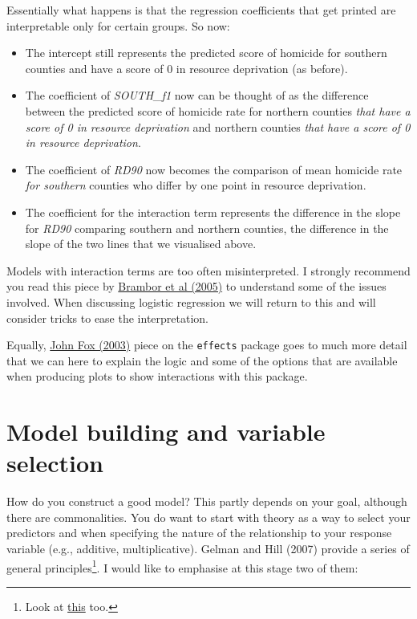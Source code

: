 \documentclass[]{book}
\begin{document}
Essentially what happens is that the regression coefficients that get printed are interpretable only for certain groups. So now:

\begin{itemize}
\item
  The intercept still represents the predicted score of homicide for southern counties and have a score of 0 in resource deprivation (as before).
\item
  The coefficient of \emph{SOUTH\_f1} now can be thought of as the difference between the predicted score of homicide rate for northern counties \emph{that have a score of 0 in resource deprivation} and northern counties \emph{that have a score of 0 in resource deprivation}.
\item
  The coefficient of \emph{RD90} now becomes the comparison of mean homicide rate \emph{for southern} counties who differ by one point in resource deprivation.
\item
  The coefficient for the interaction term represents the difference in the slope for \emph{RD90} comparing southern and northern counties, the difference in the slope of the two lines that we visualised above.
\end{itemize}

Models with interaction terms are too often misinterpreted. I strongly recommend you read this piece by \href{https://files.nyu.edu/mrg217/public/pa_final.pdf}{Brambor et al (2005)} to understand some of the issues involved. When discussing logistic regression we will return to this and will consider tricks to ease the interpretation.

Equally, \href{http://www.jstatsoft.org/v08/i15/paper}{John Fox (2003)} piece on the \texttt{effects} package goes to much more detail that we can here to explain the logic and some of the options that are available when producing plots to show interactions with this package.

\hypertarget{model-building-and-variable-selection}{%
\section{Model building and variable selection}\label{model-building-and-variable-selection}}

How do you construct a good model? This partly depends on your goal, although there are commonalities. You do want to start with theory as a way to select your predictors and when specifying the nature of the relationship to your response variable (e.g., additive, multiplicative). Gelman and Hill (2007) provide a series of general principles\footnote{Look at \href{http://www.r-bloggers.com/stop-using-bivariate-correlations-for-variable-selection/}{this} too.}. I would like to emphasise at this stage two of them:
\end{document}
